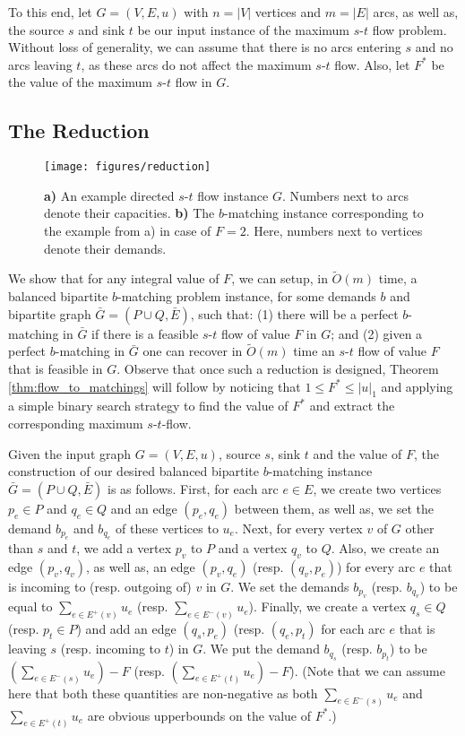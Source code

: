 \documentclass[11pt, letterpaper]{article}
\newcommand{\onorm}[1]{|#1|_{1}}
\newcommand{\tO}[1]{\widetilde{O}(#1)}
\newcommand{\oG}{\bar{G}}
\newcommand{\oE}{\bar{E}}
\newcommand{\bb}{\boldsymbol{\mathit{b}}}
\newcommand{\uu}{\boldsymbol{\mathit{u}}}
\begin{document}
To this end, let $G=(V,E,\uu)$ with $n=|V|$ vertices and $m=|E|$ arcs, as well as, the source $s$ and sink $t$ be our input instance of the maximum $s$-$t$ flow problem. Without loss of generality, we can assume that there is no arcs entering $s$ and no arcs leaving $t$, as these arcs do not affect the maximum $s$-$t$ flow. Also, let $F^*$ be the value of the maximum $s$-$t$ flow in $G$.  

\subsection{The Reduction}



\begin{figure}[ht]
\centering
\vspace{8pt}
\texttt{[image: figures/reduction]}
\vspace{8pt}
\caption{{\bf a)} An example directed $s$-$t$ flow instance $G$. Numbers next to arcs denote their capacities.  {\bf b)} The $\bb$-matching instance corresponding to the example from a) in case of $F=2$. Here, numbers next to vertices denote their demands. }
\label{fig:reduction_example}
\end{figure}


We show that for any integral value of $F$, we can setup, in $\tO{m}$ time, a balanced bipartite $\bb$-matching problem instance, for some demands $\bb$ and bipartite graph $\oG=(P\cup Q,\oE)$, such that: (1) there will be a perfect $\bb$-matching in $\oG$ if there is a feasible $s$-$t$ flow of value $F$ in $G$; and (2) given a perfect $\bb$-matching in $\oG$ one can recover in $\tO{m}$ time an $s$-$t$ flow of value $F$ that is feasible in $G$. Observe that once such a reduction is designed, Theorem \ref{thm:flow_to_matchings} will follow by noticing that $1\leq F^* \leq \onorm{\uu}$ and applying a simple binary search strategy to find the value of $F^*$ and extract the corresponding maximum $s$-$t$-flow. 

Given the input graph $G=(V,E,\uu)$, source $s$, sink $t$ and the value of $F$, the construction of our desired balanced bipartite $\bb$-matching instance $\oG=(P\cup Q,\oE)$ is as follows. First, for each arc $e\in E$, we create two vertices $p_e\in P$ and $q_e\in Q$ and an edge $(p_e,q_e)$ between them, as well as, we set the demand $b_{p_e}$ and $b_{q_e}$ of these vertices to $u_e$. Next, for every vertex $v$ of $G$ other than $s$ and $t$, we add a vertex $p_v$ to $P$ and a vertex $q_v$ to $Q$. Also, we create an edge $(p_v,q_v)$, as well as, an edge $(p_v,q_{e})$ (resp. $(q_v,p_e)$) for every arc $e$ that is incoming to (resp. outgoing of) $v$ in $G$. We set the demands $b_{p_v}$ (resp. $b_{q_v}$) to be equal to $\sum_{e\in E^+(v)} u_e$ (resp. $\sum_{e\in E^-(v)} u_e$). Finally, we create a vertex $q_s\in Q$ (resp. $p_t\in P$) and add an edge $(q_s,p_e)$ (resp. $(q_e,p_t)$ for each arc $e$ that is leaving $s$ (resp. incoming to $t$) in $G$. We put the demand $b_{q_s}$ (resp. $b_{p_t}$) to be $(\sum_{e\in E^-(s)} u_e) - F$ (resp. $(\sum_{e\in E^+(t)} u_e) - F$). (Note that we can assume here that both these quantities are non-negative as both $\sum_{e\in E^-(s)} u_e$ and $\sum_{e\in E^+(t)} u_e$ are obvious upperbounds on the value of $F^*$.) 
\end{document}
